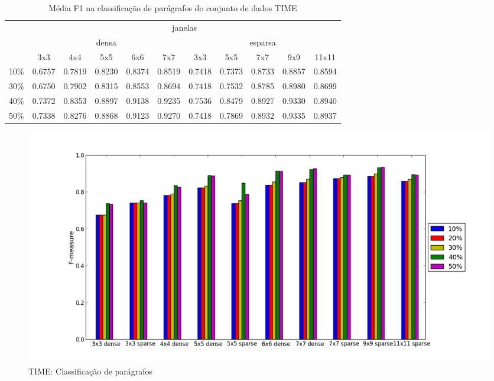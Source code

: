 \documentclass[a4paper,11pt]{article}
\begin{document}
  \begin{center}
    \begin{table}[p]
      \caption{Média F1 na classificação de parágrafos do conjunto de dados TIME}
      \begin{tabular}{ l | c c c c c || c c c c c | }
        \cline{2-11}
        & \multicolumn{10}{|c|}{janelas} \\
        \cline{2-11}
        & \multicolumn{5}{c||}{densa} & \multicolumn{5}{c|}{esparsa} \\
        \cline{2-11}
        & 3x3 & 4x4 & 5x5 & 6x6 & 7x7 & 3x3 & 5x5 & 7x7 & 9x9 & 11x11 \\
        \hline
        \multicolumn{1}{|l|}{10\%}& 0.6757& 0.7819& 0.8230& 0.8374& 0.8519& 0.7418& 0.7373& 0.8733& 0.8857& 0.8594\\
        \multicolumn{1}{|l|}{30\%}& 0.6750& 0.7902& 0.8315& 0.8553& 0.8694& 0.7418& 0.7532& 0.8785& 0.8980& 0.8699\\
        \multicolumn{1}{|l|}{40\%}& 0.7372& 0.8353& 0.8897& 0.9138& 0.9235& 0.7536& 0.8479& 0.8927& 0.9330& 0.8940\\
        \multicolumn{1}{|l|}{50\%}& 0.7338& 0.8276& 0.8868& 0.9123& 0.9270& 0.7418& 0.7869& 0.8932& 0.9335& 0.8937\\
        \hline  
      \end{tabular}
    \end{table}
  \end{center}

  \begin{figure}[p]
    \centerline{\includegraphics[width=1.2\textwidth]{assets/experiment_charts/time_TextRegion_paragraph_f1.png}}
    \caption{TIME: Classificação de parágrafos}
    \label{fig:time_TextRegion_paragraph_f1}
  \end{figure}  
\end{document}
